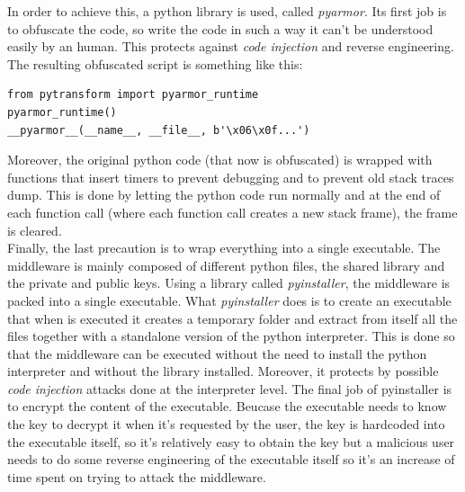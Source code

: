 In order to achieve this, a python library is used, called \textit{pyarmor}. Its first job is to obfuscate the code, so write the code in such a way it can't be understood easily by an human. This protects against \textit{code injection} and reverse engineering. The resulting obfuscated script is something like this:

\begin{lstlisting}[style=PyStyle]
from pytransform import pyarmor_runtime
pyarmor_runtime()
__pyarmor__(__name__, __file__, b'\x06\x0f...')
\end{lstlisting}

Moreover, the original python code (that now is obfuscated) is wrapped with functions that insert timers to prevent debugging and to prevent old stack traces dump. This is done by letting the python code run normally and at the end of each function call (where each function call creates a new stack frame), the frame is cleared. \\

Finally, the last precaution is to wrap everything into a single executable. The middleware is mainly composed of different python files, the shared library and the private and public keys. Using a library called \textit{pyinstaller}, the middleware is packed into a single executable. What \textit{pyinstaller} does is to create an executable that when is executed it creates a temporary folder and extract from itself all the files together with a standalone version of the python interpreter. This is done so that the middleware can be executed without the need to install the python interpreter and without the library installed. Moreover, it protects by possible \textit{code injection} attacks done at the interpreter level. The final job of pyinstaller is to encrypt the content of the executable. Beucase the executable needs to know the key to decrypt it when it's requested by the user, the key is hardcoded into the executable itself, so it's relatively easy to obtain the key but a malicious user needs to do some reverse engineering of the executable itself so it's an increase of time spent on trying to attack the middleware. 


